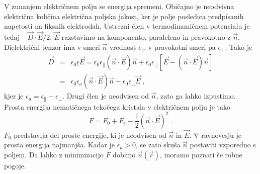 \documentclass[11pt,fleqn]{book} %
\begin{document}
V zunanjem električnem polju se energija spremeni. Običajno je neodvisna
električna količina električna poljska jakost, ker je polje posledica
predpisanih napetosti na fiksnih elektrodah. Ustrezni člen v termodinamičnem
potencialu je tedaj $-\vec{D}\cdot\vec{E}/2$. $\vec{E}$ razstavimo
na komponento, paraleleno in pravokotno z $\vec{n}$. Dielektrični
tenzor ima v smeri $\vec{n}$ vrednost $\epsilon_{\parallel}$, v
pravokotni smeri pa $\epsilon_{\perp}$. Tako je 
\begin{eqnarray}
\vec{D} & = & \epsilon_{0}\underline{\epsilon}\vec{E}=\epsilon_{0}\epsilon_{\parallel}(\vec{n}\cdot\vec{E})\vec{n}+\epsilon_{0}\epsilon_{\perp}[\vec{E}-(\vec{n}\cdot\vec{E})\vec{n}]\nonumber \\
 & = & \epsilon_{0}\epsilon_{a}(\vec{n}\cdot\vec{E})\vec{n}-\epsilon_{0}\epsilon_{\perp}\vec{E}\;,
\end{eqnarray}
 kjer je $\epsilon_{a}=\epsilon_{\parallel}-\epsilon_{\perp}$. Drugi
člen je neodvisen od $\vec{n}$, zato ga lahko izpustimo. Prosta energija
nematičnega tekočega kristala v električnem polju je tako 
\begin{equation}
F=F_{0}+F_{e}-\frac{1}{2}(\vec{n}\cdot\vec{E})^{2}\;.\label{7.72}
\end{equation}
 $F_{0}$ predstavlja del proste energije, ki je neodvisen od $\vec{n}$
in $\vec{E}$. V ravnovesju je prosta energija najmanjša. Kadar je
$\epsilon_{a}>0$, se zato skuša $\vec{n}$ postaviti vzporedno s
poljem. Da lahko z minimizacijo $F$ dobimo $\vec{n}(\vec{r})$, moramo
poznati še robne pogoje.
\end{document}
